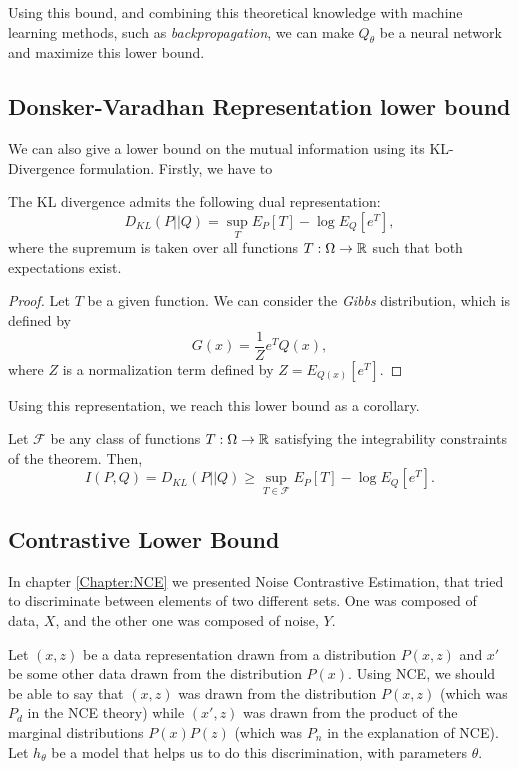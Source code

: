 Using this bound, and combining this theoretical knowledge with machine learning methods, such as \emph{backpropagation}, we can make $Q_\theta$ be a neural network and maximize this lower bound.

\subsection{Donsker-Varadhan Representation lower bound}

We can also give a lower bound on the mutual information using its KL-Divergence formulation. Firstly, we have to 

\begin{nth}
The KL divergence admits the following dual representation:
\[
D_{KL}(P || Q) = \sup_{T} E_P[T] - \log E_Q[e^T],
\]
where the supremum is taken over all functions $T:\Omega \to \mathbb{R}$ such that both expectations exist.
\end{nth}
\begin{proof}
    Let $T$ be a given function. We can consider the \emph{Gibbs} distribution, which is defined by
    \[
    G(x) = \frac{1}{Z}e^T Q(x),
    \]
    where $Z$ is a normalization term defined by $Z = E_{Q(x)}[e^T]$. 
    
\end{proof}

Using this representation, we reach this lower bound as a corollary. 

\begin{corollary}
    Let $\mathcal F$ be any class of functions $T: \Omega \to \mathbb{R}$ satisfying the integrability constraints of the theorem. Then, 
$$
I(P,Q) = D_{KL}(P||Q) \geq \sup_{T \in \mathcal F} E_P[T] - \log E_Q[e^T].
$$
\end{corollary}

\subsection{Contrastive Lower Bound}

In chapter \ref{Chapter:NCE} we presented Noise Contrastive Estimation, that tried to discriminate between elements of two different sets. One was composed of data, $X$, and the other one was composed of noise, $Y$.

Let $(x,z)$ be a data representation drawn from a distribution $P(x,z)$ and $x'$ be some other data drawn from the distribution $P(x)$. Using NCE, we should be able to say that $(x,z)$ was drawn from the distribution $P(x,z)$ (which was $P_d$ in the NCE theory) while $(x',z)$ was drawn from the product of the marginal distributions $P(x)P(z)$ (which was $P_n$ in the explanation of NCE). Let $h_\theta$ be a model that helps us to do this discrimination, with parameters $\theta$. 

